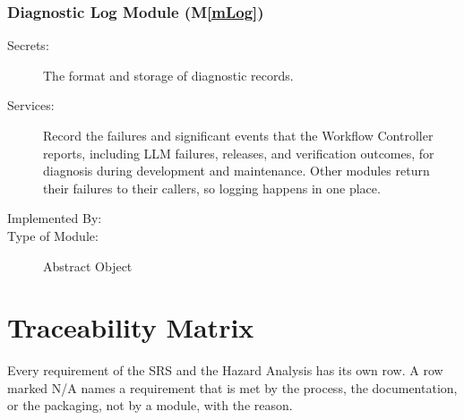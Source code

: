 \documentclass[12pt, titlepage]{article}
\newcommand{\mref}[1]{M\ref{#1}}
\begin{document}
\subsubsection{Diagnostic Log Module (\mref{mLog})}

\begin{description}
\item[Secrets:]The format and storage of diagnostic records.
\item[Services:]Record the failures and significant events that the Workflow
  Controller reports, including LLM failures, releases, and verification
  outcomes, for diagnosis during development and maintenance. Other modules
  return their failures to their callers, so logging happens in one place.
\item[Implemented By:] \progname{}
\item[Type of Module:] Abstract Object
\end{description}

\section{Traceability Matrix} \label{SecTM}

Every requirement of the SRS and the Hazard Analysis has its own row. A row
marked N/A names a requirement that is met by the process, the documentation,
or the packaging, not by a module, with the reason.
\end{document}
